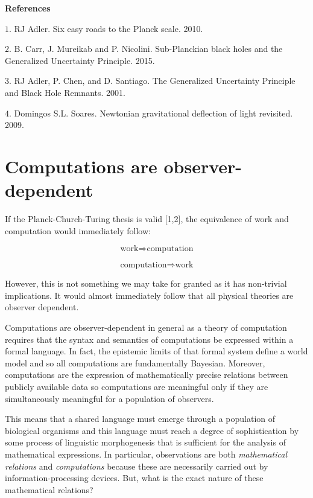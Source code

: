 \documentclass{article}
\begin{document}
\textbf{References}

$1.$  RJ Adler. Six easy roads to the Planck scale. 2010.

$2.$ B. Carr, J. Mureikab and P. Nicolini. Sub-Planckian black holes and the Generalized Uncertainty Principle. 2015.

$3.$ RJ Adler, P. Chen, and D. Santiago. The Generalized Uncertainty Principle and Black Hole Remnants. 2001.

$4.$ Domingos S.L. Soares. Newtonian gravitational deflection of light revisited. 2009.

\newpage 

\section{Computations are observer-dependent}

If the Planck-Church-Turing thesis is valid [1,2], the equivalence of work and computation would immediately follow:

\begin{equation}
\textrm{work} \Rightarrow \textrm{computation}
\end{equation}

\begin{equation}
\textrm{computation} \Rightarrow \textrm{work}
\end{equation}

However, this is not something we may take for granted as it has non-trivial implications.
It would almost immediately follow that all physical theories are observer
dependent.

Computations are observer-dependent in general as a theory of computation requires that the syntax
and semantics of computations be expressed within a formal language. In fact, the epistemic limits
of that formal system define a world model and so all computations are fundamentally Bayesian. Moreover,
computations are the expression of mathematically precise relations between publicly available data so
computations are meaningful only if they are simultaneously meaningful for a population of observers.

This means that a shared language must emerge through a population of biological
organisms and this language must reach a degree of sophistication by some process of linguistic
morphogenesis that is sufficient for the analysis of mathematical expressions. In particular, observations are both
\textit{mathematical relations} and \textit{computations} because these are necessarily carried out by information-processing devices.
But, what is the exact nature of these mathematical relations?
\end{document}
